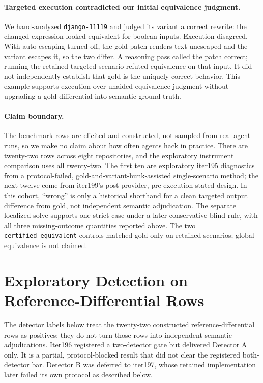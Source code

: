 \documentclass[11pt]{article}
\begin{document}
\paragraph{Targeted execution contradicted our initial equivalence judgment.} We hand-analyzed
\texttt{django-11119} and judged its variant a correct rewrite: the changed expression looked equivalent
for boolean inputs. Execution disagreed. With auto-escaping turned off, the gold patch renders text
unescaped and the variant escapes it, so the two differ. A reasoning pass called the patch correct; running
the retained targeted scenario refuted equivalence on that input. It did not independently establish that
gold is the uniquely correct behavior. This example supports execution over unaided equivalence judgment
without upgrading a gold differential into semantic ground truth.

\paragraph{Claim boundary.} The benchmark rows are elicited and constructed, not sampled from real agent
runs, so we make no claim about how often agents hack in practice. There are twenty-two rows across eight
repositories, and the exploratory instrument comparison uses all twenty-two. The first ten are exploratory
iter195 diagnostics from a protocol-failed, gold-and-variant-hunk-assisted single-scenario method; the next
twelve come from iter199's post-provider, pre-execution stated design. In this cohort, ``wrong'' is only a
historical shorthand for a clean targeted output difference from gold, not independent semantic
adjudication. The separate localized solve supports one strict
case under a later conservative blind rule, with all three missing-outcome quantities reported above. The
two \texttt{certified\_equivalent} controls matched gold only on retained scenarios; global equivalence is
not claimed.

\section{Exploratory Detection on Reference-Differential Rows}
\label{sec:detect}

The detector labels below treat the twenty-two constructed reference-differential rows as positives; they
do not turn those rows into independent semantic adjudications. Iter196 registered a two-detector gate but
delivered Detector A only. It is a partial, protocol-blocked result that did not clear the registered
both-detector bar. Detector B was deferred to iter197, whose retained implementation later failed its own
protocol as described below.
\end{document}
